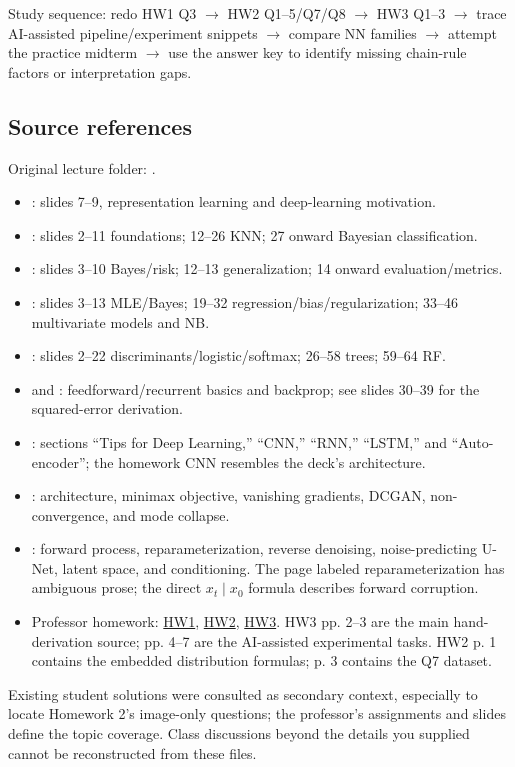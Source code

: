 \documentclass[11pt]{article}
\begin{document}
Study sequence: redo HW1 Q3 \ensuremath{\rightarrow} HW2 Q1–5/\allowbreak{}Q7/\allowbreak{}Q8 \ensuremath{\rightarrow} HW3 Q1–3 \ensuremath{\rightarrow} trace AI-assisted pipeline/\allowbreak{}experiment snippets \ensuremath{\rightarrow} compare NN families \ensuremath{\rightarrow} attempt the practice midterm \ensuremath{\rightarrow} use the answer key to identify missing chain-rule factors or interpretation gaps.

\subsection*{Source references}

Original lecture folder: .

\begin{itemize}
\item {}: slides 7–9, representation learning and deep-learning motivation.
\item {}: slides 2–11 foundations; 12–26 KNN; 27 onward Bayesian classification.
\item {}: slides 3–10 Bayes/\allowbreak{}risk; 12–13 generalization; 14 onward evaluation/\allowbreak{}metrics.
\item {}: slides 3–13 MLE/\allowbreak{}Bayes; 19–32 regression/\allowbreak{}bias/\allowbreak{}regularization; 33–46 multivariate models and NB.
\item {}: slides 2–22 discriminants/\allowbreak{}logistic/\allowbreak{}softmax; 26–58 trees; 59–64 RF.
\item {} and : feedforward/\allowbreak{}recurrent basics and backprop; see slides 30–39 for the squared-error derivation.
\item {}: sections “Tips for Deep Learning,” “CNN,” “RNN,” “LSTM,” and “Auto-encoder”; the homework CNN resembles the deck's architecture.
\item {}: architecture, minimax objective, vanishing gradients, DCGAN, non-convergence, and mode collapse.
\item {}: forward process, reparameterization, reverse denoising, noise-predicting U-Net, latent space, and conditioning. The page labeled reparameterization has ambiguous prose; the direct $x_t\mid x_0$ formula describes forward corruption.
\item Professor homework: \href{\detokenize{../Homework/Homework1/Homework1_revised.pdf}}{HW1}, \href{\detokenize{../Homework/Homework2/homework2_v3.pdf}}{HW2}, \href{\detokenize{../Homework/Homework3/Homework3_revision/Homework3_revision/Homework3_revised.pdf}}{HW3}. HW3 pp. 2–3 are the main hand-derivation source; pp. 4–7 are the AI-assisted experimental tasks. HW2 p. 1 contains the embedded distribution formulas; p. 3 contains the Q7 dataset.
\end{itemize}

Existing student solutions were consulted as secondary context, especially to locate Homework 2's image-only questions; the professor's assignments and slides define the topic coverage. Class discussions beyond the details you supplied cannot be reconstructed from these files.
\end{document}
